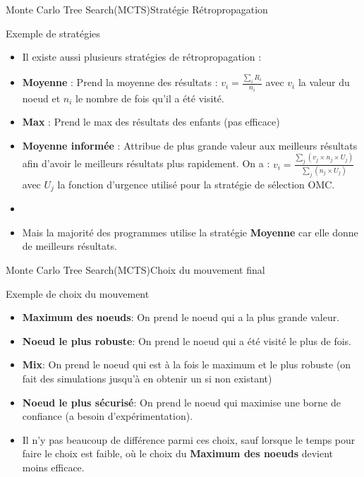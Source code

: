 \begin{frame}{Monte Carlo Tree Search(MCTS)}{Stratégie Rétropropagation}
	\begin{block}{Exemple de stratégies}
		\begin{itemize}
			\item Il existe aussi plusieurs stratégies de rétropropagation :
			\item \textbf{Moyenne} : Prend la moyenne des résultats : $v_{i} = \frac{\sum_{i}^{}R_{i}}{n_{i}}$ avec $v_{i}$ la valeur du noeud et $n_i$ le nombre de fois qu'il a été visité.
			\item \textbf{Max} : Prend le max des résultats des enfants (pas efficace)
			\item \textbf{Moyenne informée} : Attribue de plus grande valeur aux meilleurs résultats afin d'avoir le meilleurs résultats plus rapidement.
			On a : $v_{i} = \frac{\sum_{j}^{}(v_{j}\times n_{j}\times U_{j})}{\sum_{j}^{}(n_{j}\times U_{j})}$ avec $U_{j}$ la fonction d'urgence utilisé pour la stratégie de sélection OMC.
			\item \
			\item Mais la majorité des programmes utilise la stratégie \textbf{Moyenne} car elle donne de meilleurs résultats.
		\end{itemize}
	\end{block}
\end{frame}

\begin{frame}{Monte Carlo Tree Search(MCTS)}{Choix du mouvement final}
	\begin{block}{Exemple de choix du mouvement}
		\begin{itemize}
			\item \textbf{Maximum des noeuds}: On prend le noeud qui a la plus grande valeur.
			\item \textbf{Noeud le plus robuste}: On prend le noeud qui a été visité le plus de fois.
			\item \textbf{Mix}: On prend le noeud qui est à la fois le maximum et le plus robuste (on fait des simulations jusqu'à en obtenir un si non existant)
			\item \textbf{Noeud le plus sécurisé}: On prend le noeud qui maximise une borne de confiance (a besoin d'expérimentation).
			\item Il n'y pas beaucoup de différence parmi ces choix, sauf lorsque le temps pour faire le choix est faible, où le choix du \textbf{Maximum des noeuds} devient moins efficace.
		\end{itemize}
	\end{block}
\end{frame}

